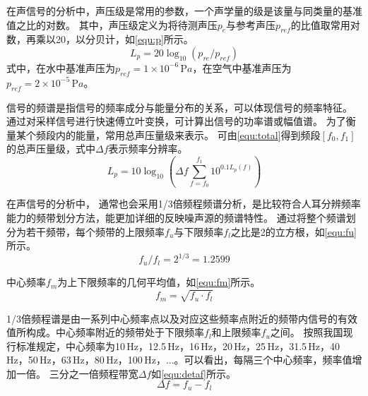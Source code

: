在声信号的分析中，声压级是常用的参数，一个声学量的级是该量与同类量的基准值之比的对数。
其中，声压级定义为将待测声压$p_e$与参考声压$p_{ref}$的比值取常用对数，再乘以20，以分贝计，如\autoref{equ:p}所示。
\begin{equation}
    \label{equ:p}
    L_{p} = 20\log_{10}{\left(p_{re}/p_{ref}\right )}
\end{equation}
式中，在水中基准声压为$p_{ref}= 1\times 10^{-6} \,\mathrm{P} a$，在空气中基准声压为$p_{ref}= 2\times 10^{-5} \,\mathrm{P} a$。
\begin{comment}
同理，振动加速度级也定义为加速度有效值$a_e$与基准加速度$a_{ref}$之比的以10为底的对数，再乘以20，以分贝计，即
\begin{equation}
    \label{equ:a}
    L_{a} = 20\log_{10}{\left(a_{re}/a_{ref}\right )}
\end{equation}
式中，基准加速度值为$a_{ref}= 1\times 10^{-6} \mathrm{\,m/s^2} $。
\end{comment}

信号的频谱是指信号的频率成分与能量分布的关系，可以体现信号的频率特征。
通过对采样信号进行快速傅立叶变换，可计算出信号的功率谱或幅值谱。
为了衡量某个频段内的能量，常用总声压量级来表示。
可由\autoref{equ:total}得到频段$\left [ f_0,f_1 \right ]$的总声压量级，式中$\Delta f$表示频率分辨率\cite{}。
\begin{equation}
    \label{equ:total}
    L_p=10\log_{10}{\left (\Delta f \sum_{f=f_0}^{f_1}10^{0.1L_p\left ( f \right )}    \right )  } 
\end{equation}

在声信号的分析中，
通常也会采用1/3倍频程频谱分析，是比较符合人耳分辨频率能力的频带划分方法，能更加详细的反映噪声源的频谱特性。
通过将整个频谱划分为若干频带，每个频带的上限频率$f_u$与下限频率$f_l$之比是2的立方根，如\autoref{equ:fu}所示。
\begin{equation}
    \label{equ:fu}
    f_{u}/f_{l}=2^{1/3}=1.2599
\end{equation}

中心频率$f_{m}$为上下限频率的几何平均值，如\autoref{equ:fm}所示。
\begin{equation}
    \label{equ:fm}
    f_{m}=\sqrt{f_{u}\cdot f_{l} } 
\end{equation}

1/3倍频程谱是由一系列中心频率点以及对应这些频率点附近的频带内信号的有效值所构成。中心频率附近的频带处于下限频率$f_l$和上限频率$f_u$之间。
按照我国现行标准规定，中心频率为10\,Hz，12.5\,Hz，16\,Hz，20\,Hz，25\,Hz，31.5\,Hz，40\,Hz，50\,Hz，63\,Hz，80\,Hz，100\,Hz，...。可以看出，每隔三个中心频率，频率值增加一倍。
三分之一倍频程带宽$\Delta f$如\autoref{equ:detaf}所示。
\begin{equation}
    \label{equ:detaf}
    \Delta f=f_{u}-f_{l}
\end{equation}

